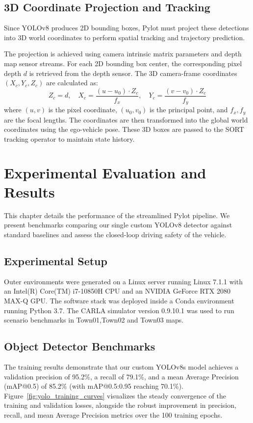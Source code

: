 \documentclass[11pt,a4paper]{report}
\begin{document}
\section{3D Coordinate Projection and Tracking}
Since YOLOv8 produces 2D bounding boxes, Pylot must project these detections into 3D world coordinates to perform spatial tracking and trajectory prediction. 

The projection is achieved using camera intrinsic matrix parameters and depth map sensor streams. For each 2D bounding box center, the corresponding pixel depth $d$ is retrieved from the depth sensor. The 3D camera-frame coordinates $(X_c, Y_c, Z_c)$ are calculated as:
\begin{equation}
    Z_c = d, \quad X_c = \frac{(u - u_0) \cdot Z_c}{f_x}, \quad Y_c = \frac{(v - v_0) \cdot Z_c}{f_y}
\end{equation}
where $(u, v)$ is the pixel coordinate, $(u_0, v_0)$ is the principal point, and $f_x, f_y$ are the focal lengths. The coordinates are then transformed into the global world coordinates using the ego-vehicle pose. These 3D boxes are passed to the SORT tracking operator to maintain state history.

\chapter{Experimental Evaluation and Results}

This chapter details the performance of the streamlined Pylot pipeline. We present benchmarks comparing our single custom YOLOv8 detector against standard baselines and assess the closed-loop driving safety of the vehicle.

\section{Experimental Setup}
Outer environments were generated on a Linux server running Linux 7.1.1 with an Intel(R) Core(TM) i7-10850H CPU and an NVIDIA GeForce RTX 2080 MAX-Q GPU. The software stack was deployed inside a Conda environment running Python 3.7. The CARLA simulator version 0.9.10.1 was used to run scenario benchmarks in Town01,Town02 and Town03 maps. 

\section{Object Detector Benchmarks}
The training results demonstrate that our custom YOLOv8s model achieves a validation precision of 95.2\%, a recall of 79.1\%, and a mean Average Precision (mAP@0.5) of 85.2\% (with mAP@0.5:0.95 reaching 70.1\%). Figure~\ref{fig:yolo_training_curves} visualizes the steady convergence of the training and validation losses, alongside the robust improvement in precision, recall, and mean Average Precision metrics over the 100 training epochs.
\end{document}

